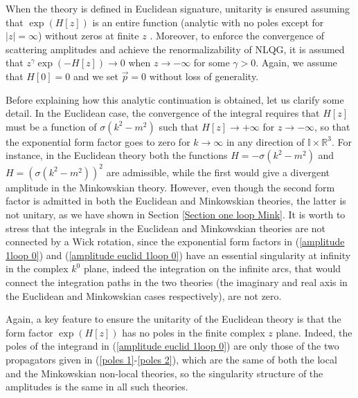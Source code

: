 \documentclass[a4paper,11pt]{article}
\begin{document}
When the theory is defined in Euclidean signature, unitarity is ensured assuming that $\exp\left(H[z]\right)$ is an entire function  (analytic with no poles except for $|z|=\infty$) without zeros at finite $z$ \cite{unitarity1,unitarity2,unitarity3}. Moreover, to enforce the convergence of scattering amplitudes and achieve the renormalizability of NLQG, it is assumed that $z^\gamma \exp\left(-H\left[z\right]\right)\rightarrow 0$ when $z\rightarrow - \infty$ for some $\gamma >0$.
Again, we assume that $H\left[0\right]=0$ and we  set $\vec{p}=0$ without loss of generality.

Before explaining how this analytic continuation is obtained, let us clarify some detail. In the Euclidean case, the convergence of the integral requires that $H[z]$  must be a function of $\sigma\left(k^2-m^2\right)$ such that $H[z]\rightarrow +\infty$ for $z\rightarrow -\infty$, so that the exponential form factor goes to zero for $k \rightarrow \infty$ in any direction of $\mathbb{I}\times \mathbb{R}^3$. For instance, in the Euclidean theory both the functions $H= - \sigma\left(k^2-m^2\right)$ and $H=\left(\sigma\left(k^2-m^2\right)\right)^2$ are admissible, while the first would give a divergent amplitude in the Minkowskian theory. However, even though the second form factor is admitted in both the Euclidean and Minkowskian theories, the latter is not unitary, as we have shown in Section \ref{Section one loop Mink}. It is worth to stress that the integrals in the Euclidean and Minkowskian theories are not connected by a Wick rotation, since the exponential form factors in (\ref{amplitude 1loop 0}) and (\ref{amplitude euclid 1loop 0}) have an essential singularity at infinity in the complex $k^0$ plane, indeed the integration on the infinite arcs,  that would connect the integration paths  in the two theories (the imaginary and real  axis in the Euclidean and Minkowskian cases respectively), are not zero.

 


Again, a key feature to ensure the unitarity of the Euclidean theory is that the form factor $\exp\left(H\left[z\right]\right)$ has no poles in the finite complex $z$ plane. Indeed, the poles of the integrand in (\ref{amplitude euclid 1loop 0}) are only those of the two propagators given in (\ref{poles 1}-\ref{poles 2}), which are the same of both the local and the Minkowskian non-local theories, so the singularity structure of the amplitudes is the same in all such theories. 
\end{document}
